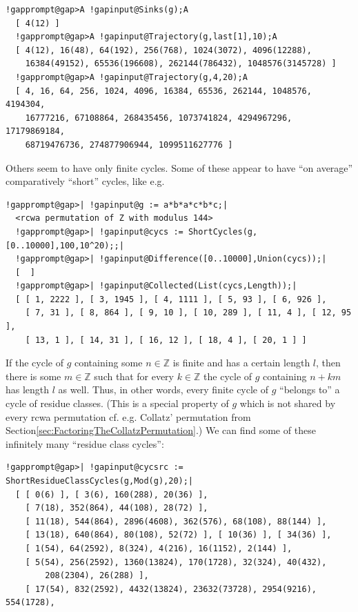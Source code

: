 \documentclass[a4paper,11pt]{report}
\begin{document}
{{\begin{Verbatim}[commandchars=!@A,fontsize=\small,frame=single,label=Example]
  !gapprompt@gap>A !gapinput@Sinks(g);A
  [ 4(12) ]
  !gapprompt@gap>A !gapinput@Trajectory(g,last[1],10);A
  [ 4(12), 16(48), 64(192), 256(768), 1024(3072), 4096(12288), 
    16384(49152), 65536(196608), 262144(786432), 1048576(3145728) ]
  !gapprompt@gap>A !gapinput@Trajectory(g,4,20);A
  [ 4, 16, 64, 256, 1024, 4096, 16384, 65536, 262144, 1048576, 4194304, 
    16777216, 67108864, 268435456, 1073741824, 4294967296, 17179869184, 
    68719476736, 274877906944, 1099511627776 ]
\end{Verbatim}
 Others seem to have only finite cycles. Some of these appear to have ``on average'' comparatively ``short'' cycles, like e.g. 
\begin{Verbatim}[commandchars=!@|,fontsize=\small,frame=single,label=Example]
  !gapprompt@gap>| !gapinput@g := a*b*a*c*b*c;|
  <rcwa permutation of Z with modulus 144>
  !gapprompt@gap>| !gapinput@cycs := ShortCycles(g,[0..10000],100,10^20);;|
  !gapprompt@gap>| !gapinput@Difference([0..10000],Union(cycs));|
  [  ]
  !gapprompt@gap>| !gapinput@Collected(List(cycs,Length));|
  [ [ 1, 2222 ], [ 3, 1945 ], [ 4, 1111 ], [ 5, 93 ], [ 6, 926 ], 
    [ 7, 31 ], [ 8, 864 ], [ 9, 10 ], [ 10, 289 ], [ 11, 4 ], [ 12, 95 ], 
    [ 13, 1 ], [ 14, 31 ], [ 16, 12 ], [ 18, 4 ], [ 20, 1 ] ]
\end{Verbatim}
 If the cycle of $g$ containing some $n \in {\ensuremath{\mathbb Z}}$ is finite and has a certain length $l$, then there is some $m \in {\ensuremath{\mathbb Z}}$ such that for every $k \in {\ensuremath{\mathbb Z}}$ the cycle of $g$ containing $n + km$ has length $l$ as well. Thus, in other words, every finite cycle of $g$ ``belongs to'' a cycle of residue classes. (This is a special property of $g$ which is not shared by every rcwa permutation
\texttt{}\texttt{} cf. e.g. Collatz' permutation from
Section{\nobreakspace}\ref{sec:FactoringTheCollatzPermutation}.) We can find some of these infinitely many ``residue class cycles'': 
\begin{Verbatim}[commandchars=!@|,fontsize=\small,frame=single,label=Example]
  !gapprompt@gap>| !gapinput@cycsrc := ShortResidueClassCycles(g,Mod(g),20);|
  [ [ 0(6) ], [ 3(6), 160(288), 20(36) ], 
    [ 7(18), 352(864), 44(108), 28(72) ], 
    [ 11(18), 544(864), 2896(4608), 362(576), 68(108), 88(144) ], 
    [ 13(18), 640(864), 80(108), 52(72) ], [ 10(36) ], [ 34(36) ], 
    [ 1(54), 64(2592), 8(324), 4(216), 16(1152), 2(144) ], 
    [ 5(54), 256(2592), 1360(13824), 170(1728), 32(324), 40(432), 
        208(2304), 26(288) ], 
    [ 17(54), 832(2592), 4432(13824), 23632(73728), 2954(9216), 554(1728), 

\end{Verbatim}}}
\end{document}
